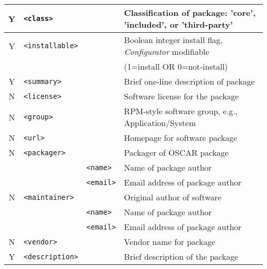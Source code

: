 \begin{table}[h!]
\begin{small}
\begin{center}
\begin{tabular}{|c|l|l|l|}
  Y & \verb|<class>|   
		&   
		& Classification of package: {\small 'core', 'included', or  'third-party'}
		\\ \hline

  Y & \verb|<installable>|   
		&   
		& Boolean integer install flag, \emph{Configurator} modifiable 
		\\ 
    &
		&
		& (1=install OR 0=not-install)
		\\\hline

  Y & \verb|<summary>| 
		&   
		& Brief one-line description of package         
		\\ \hline

  N & \verb|<license>| 
		&   
		& Software license for the package              
		\\ \hline

  N & \verb|<group>|   
		&   
		& RPM-style software group, e.g., Application/System
		\\\hline

  N & \verb|<url>|     
		&   
		& Homepage for software package                 
		\\ \hline

  N & \verb|<packager>|
		&   
		& Packager of OSCAR package              
		\\\cline{3-4}
%
    & 
		& \verb|<name>|   
		& Name of package author                    
		\\\cline{3-4}
%
    & 
		& \verb|<email>|  
		& Email address of package author           
		\\\hline

  N & \verb|<maintainer>|
		& 
		& Original author of software            
		\\\cline{3-4}
%
    & 
		& \verb|<name>|   
		& Name of package author                    
		\\\cline{3-4}
%
    & 
		& \verb|<email>|  
		& Email address of package author           
		\\\hline

  N & \verb|<vendor>|
		& 
		& Vendor name for package
		\\\hline

  Y & \verb|<description>|
		&
		& Brief description of the package              
		\\ \hline


\end{tabular}
\end{center}
\end{small}
\end{table}
